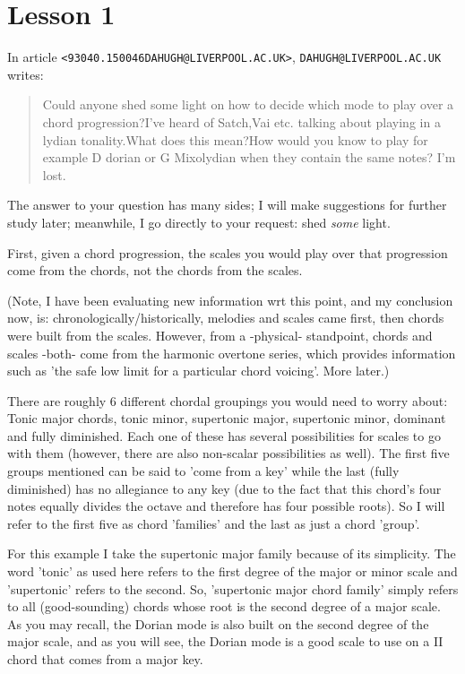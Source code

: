 \section{Lesson 1}
In article \texttt{\textless93040.150046DAHUGH@LIVERPOOL.AC.UK\textgreater}, \texttt{DAHUGH@LIVERPOOL.AC.UK} writes:
\begin{quote}
  Could anyone shed some light on how to decide which mode to play over a chord progression?I've heard of Satch,Vai etc. talking about playing in a lydian tonality.What does this mean?How would you know to play for example D dorian or G Mixolydian when they contain the same notes? I'm lost.
\end{quote}

The answer to your question has many sides; I will make suggestions for 
further study later; meanwhile, I go directly to your request: shed \emph{some} 
light.

First, given a chord progression, the scales you would play over that
progression come from the chords, not the chords from the scales.

(Note, I have been evaluating new information wrt this point, and my
conclusion now, is: chronologically/historically, melodies and scales
came first, then chords were built from the scales. However, from a
-physical- standpoint, chords and scales -both- come from the harmonic
overtone series, which provides information such as 'the safe low limit
for a particular chord voicing'. More later.)

There are roughly 6 different chordal groupings you would need to worry about:
Tonic major chords, tonic minor, supertonic major, supertonic minor, dominant
and fully diminished. Each one of these has several possibilities for scales
to go with them (however, there are also non-scalar possibilities as well).
The first five groups mentioned can be said to 'come from a key' while the last
(fully diminished) has no allegiance to any key (due to the fact that this
chord's four notes equally divides the octave and therefore has four possible
roots). So I will refer to the first five as chord 'families' and the last
as just a chord 'group'.

For this example I take the supertonic major family because of its simplicity.
The word 'tonic' as used here refers to the first degree of the major or minor
scale and 'supertonic' refers to the second. So, 'supertonic major chord family'
simply refers to all (good-sounding) chords whose root is the second degree of
a major scale. As you may recall, the Dorian mode is also built on the second
degree of the major scale, and as you will see, the Dorian mode is a good
scale to use on a II chord that comes from a major key.

